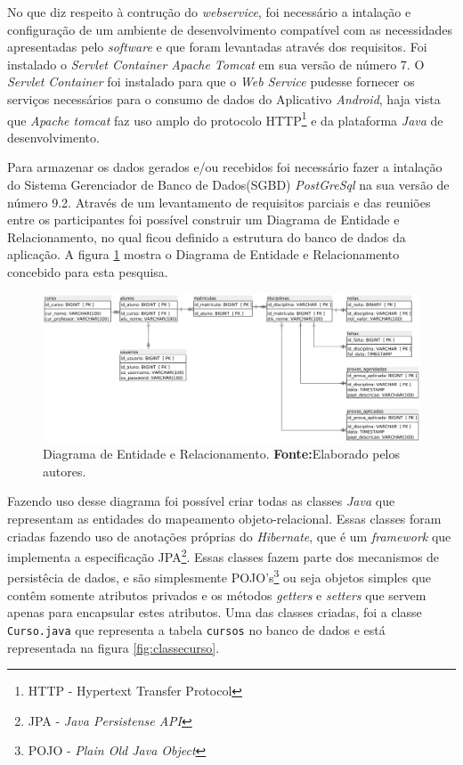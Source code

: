 		\par No que diz respeito à contrução do \textit{webservice}, foi necessário a
	intalação e configuração de um ambiente de desenvolvimento compatível com as
	necessidades apresentadas pelo \textit{software} e que foram levantadas
	através dos requisitos. Foi instalado o \textit{Servlet Container Apache
	Tomcat} em sua versão de número 7. O \textit{Servlet Container} foi instalado
	para que o \textit{Web Service} pudesse fornecer os serviços necessários para
	o consumo de dados do Aplicativo \textit{Android}, haja vista que
	\textit{Apache tomcat} faz uso amplo do protocolo HTTP\footnote{HTTP -
	Hypertext Transfer Protocol} e da plataforma \textit{Java} de desenvolvimento.
			
		\par Para armazenar os dados gerados e/ou recebidos foi necessário fazer a
	intalação do Sistema Gerenciador de Banco de Dados(SGBD) \textit{PostGreSql} na
	sua versão de número 9.2. Através de um levantamento de requisitos parciais e das
	reuniões entre os participantes foi possível construir um Diagrama de Entidade
	e Relacionamento, no qual ficou definido a estrutura do banco de dados da
	aplicação. A figura \ref{fig:exemplo5} mostra o Diagrama de Entidade e
	Relacionamento concebido para esta pesquisa.

		\begin{figure}[h!]
			\centerline{\includegraphics[scale=0.5]{./imagens/imagem5.png}}
			\caption[Diagrama de Entidade e Relacionamento]{Diagrama de Entidade e
			Relacionamento.
			\textbf{Fonte:}Elaborado pelos autores.}
			\label{fig:exemplo5}
		\end{figure}

		\par Fazendo uso desse diagrama foi possível criar todas as classes
	\textit{Java} que representam as entidades do mapeamento objeto-relacional. 
	Essas classes foram criadas fazendo uso de anotações próprias do
	\textit{Hibernate}, que é um \textit{framework} que implementa a especificação
	JPA\footnote{JPA - \textit{Java Persistense API}}. Essas classes fazem parte
	dos mecanismos de persistêcia de dados, e são simplesmente POJO's\footnote{POJO
	- \textit{Plain Old Java Object }} ou seja objetos simples que contêm somente
	atributos privados e os métodos \textit{getters} e \textit{setters} que servem
	apenas para encapsular estes atributos. Uma das classes criadas, foi a classe
	\texttt{Curso.java} que representa a tabela \texttt{cursos} no banco de dados e
	está representada na figura \ref{fig:classecurso}.
	
